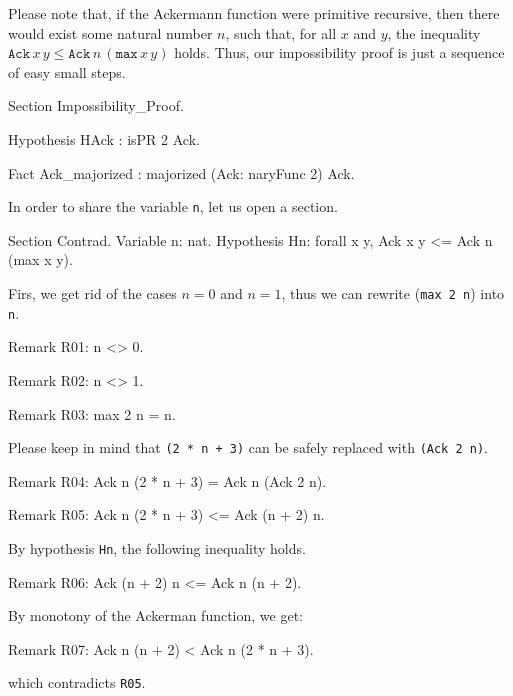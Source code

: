 Please note that, if the Ackermann function were primitive recursive, then there would exist some natural number $n$, such that, for all $x$ and $y$, the inequality 
$\texttt{Ack}\,x\,y\leq \texttt{Ack}\,n\,(\texttt{max}\,x\,y)$ holds.
Thus, our impossibility proof is just a sequence of easy small steps.

\begin{Coqsrc}
Section Impossibility_Proof.

  Hypothesis HAck : isPR 2 Ack.

  Fact Ack_majorized : majorized (Ack: naryFunc 2)  Ack.
 \end{Coqsrc}
  
 In order to share the variable \texttt{n}, let us open a section.

\begin{Coqsrc}
  Section Contrad.
    Variable n: nat.
    Hypothesis  Hn: forall x y,  Ack x y <= Ack n (max x  y).
\end{Coqsrc}

Firs, we get rid of the cases $n=0$ and $n=1$, thus we can rewrite
(\texttt{max 2 n}) into \texttt{n}.

  \begin{Coqsrc}
    Remark R01: n <> 0.
  
    Remark R02: n <> 1.
   
    Remark R03: max 2 n = n.
\end{Coqsrc}

Please keep in mind that \texttt{(2 * n + 3)} can be safely replaced with 
\texttt{(Ack 2 n)}.

\begin{Coqsrc}
    Remark R04: Ack n (2 * n + 3) = Ack n (Ack 2 n).
       
    Remark R05: Ack n (2 * n + 3) <= Ack (n + 2) n.
\end{Coqsrc}

 By hypothesis \texttt{Hn}, the following inequality holds.

 \begin{Coqsrc}
    Remark R06: Ack (n + 2) n <= Ack n (n + 2).
 \end{Coqsrc}

By monotony of the Ackerman function, we get:

\begin{Coqsrc}
    Remark R07: Ack n (n + 2) < Ack n (2 * n + 3).
\end{Coqsrc}
     
which contradicts \texttt{R05}.

